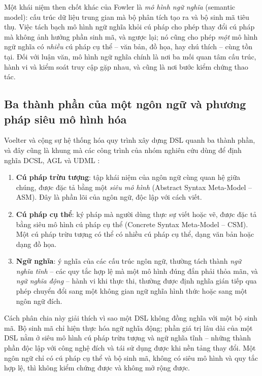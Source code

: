 Một khái niệm then chốt khác của Fowler là \emph{mô hình ngữ nghĩa} (semantic model): cấu trúc dữ liệu trung gian mà bộ phân tích tạo ra và bộ sinh mã tiêu thụ. Việc tách bạch mô hình ngữ nghĩa khỏi cú pháp cho phép thay đổi cú pháp mà không ảnh hưởng phần sinh mã, và ngược lại; nó cũng cho phép \emph{một} mô hình ngữ nghĩa có \emph{nhiều} cú pháp cụ thể -- văn bản, đồ họa, hay chú thích -- cùng tồn tại. Đối với luận văn, mô hình ngữ nghĩa chính là nơi ba mối quan tâm cấu trúc, hành vi và kiểm soát truy cập gặp nhau, và cũng là nơi bước kiểm chứng thao tác.

\subsection{Ba thành phần của một ngôn ngữ và phương pháp siêu mô hình hóa}
\label{subsec:ba-thanh-phan}

Voelter và cộng sự \cite{voelter2013} hệ thống hóa quy trình xây dựng DSL quanh ba thành phần, và đây cũng là khung mà các công trình của nhóm nghiên cứu dùng để định nghĩa DCSL, AGL và UDML \cite{le2018dcsl,dang2023agl,le2025udml}:

\begin{enumerate}[leftmargin=1.8em,itemsep=3pt]
  \item \textbf{Cú pháp trừu tượng}: tập khái niệm của ngôn ngữ cùng quan hệ giữa chúng, được đặc tả bằng một \emph{siêu mô hình} (Abstract Syntax Meta-Model -- ASM). Đây là phần lõi của ngôn ngữ, độc lập với cách viết.
  \item \textbf{Cú pháp cụ thể}: ký pháp mà người dùng thực sự viết hoặc vẽ, được đặc tả bằng siêu mô hình cú pháp cụ thể (Concrete Syntax Meta-Model -- CSM). Một cú pháp trừu tượng có thể có nhiều cú pháp cụ thể, dạng văn bản hoặc dạng đồ họa.
  \item \textbf{Ngữ nghĩa}: ý nghĩa của các cấu trúc ngôn ngữ, thường tách thành \emph{ngữ nghĩa tĩnh} -- các quy tắc hợp lệ mà một mô hình đúng đắn phải thỏa mãn, và \emph{ngữ nghĩa động} -- hành vi khi thực thi, thường được định nghĩa gián tiếp qua phép chuyển đổi sang một không gian ngữ nghĩa hình thức hoặc sang một ngôn ngữ đích.
\end{enumerate}

\begin{nhanxet}
Cách phân chia này giải thích vì sao một DSL không đồng nghĩa với một bộ sinh mã. Bộ sinh mã chỉ hiện thực hóa ngữ nghĩa động; phần giá trị lâu dài của một DSL nằm ở siêu mô hình cú pháp trừu tượng và ngữ nghĩa tĩnh -- những thành phần độc lập với công nghệ đích và tái sử dụng được khi nền tảng thay đổi. Một ngôn ngữ chỉ có cú pháp cụ thể và bộ sinh mã, không có siêu mô hình và quy tắc hợp lệ, thì không kiểm chứng được và không mở rộng được.
\end{nhanxet}

